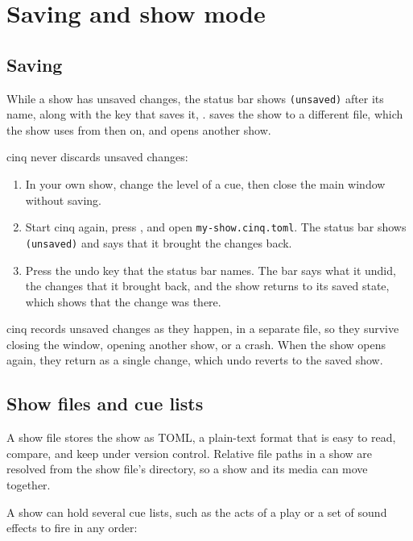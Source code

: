 %

\chapter{Saving and show mode}
\label{ch:saving}

\section{Saving}

While a show has unsaved changes, the status bar shows \texttt{(unsaved)}
after its name, along with the key that saves it, .
 saves the show to a different file, which the show uses from
then on, and  opens another show.

cinq never discards unsaved changes:

\begin{enumerate}
\item In your own show, change the level of a cue, then close the main
  window without saving.
\item Start cinq again, press , and open
  \texttt{my-show.cinq.toml}.  The status bar shows \texttt{(unsaved)} and
  says that it brought the changes back.
\item Press the undo key that the status bar names.  The bar says what it
  undid, the changes that it brought back, and the show returns to its saved
  state, which shows that the change was there.
\end{enumerate}

cinq records unsaved changes as they happen, in a separate file, so they
survive closing the window, opening another show, or a crash.  When the show
opens again, they return as a single change, which undo reverts to the saved
show.

\section{Show files and cue lists}

A show file stores the show as TOML, a plain-text format that is easy to
read, compare, and keep under version control.  Relative file paths in a show
are resolved from the show file's directory, so a show and its media can move
together.

A show can hold several cue lists, such as the acts of a play or a set of
sound effects to fire in any order:

